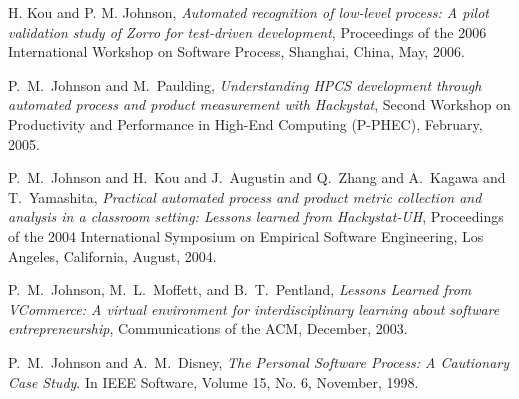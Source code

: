 \documentclass[11pt]{article}
\begin{document}
\begin{Publications: Other Significant}

\item H. Kou and P. M. Johnson, {\em Automated recognition of low-level process:
A pilot validation study of Zorro for test-driven development}, Proceedings of 
the 2006 International Workshop on Software Process, Shanghai, China, May, 2006.

\item P.~M.~Johnson and M.~Paulding, {\em Understanding HPCS development
through automated process and product measurement with Hackystat}, Second
Workshop on Productivity and Performance in High-End Computing (P-PHEC),
February, 2005.

\item P.~M.~Johnson and H.~Kou and J.~Augustin and Q.~Zhang and A.~Kagawa
and T.~Yamashita, {\em Practical automated process and product metric
collection and analysis in a classroom setting: Lessons learned from
Hackystat-UH}, Proceedings of the 2004 International Symposium on Empirical
Software Engineering, Los Angeles, California, August, 2004.

\item P.~M.~Johnson, M.~L.~Moffett, and B.~T.~Pentland, {\em Lessons
Learned from VCommerce: A virtual environment for interdisciplinary
learning about software entrepreneurship}, Communications of
the ACM, December, 2003.

\item P.~M.~Johnson and A.~M.~Disney, {\em The Personal Software Process: A
    Cautionary Case Study}.  In IEEE Software, Volume 15, No. 6, November,
  1998.

\end{Publications: Other Significant}
\end{document}
